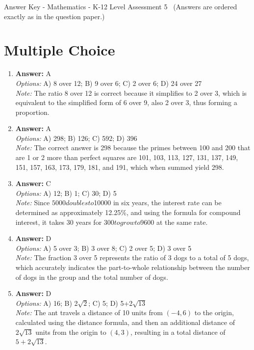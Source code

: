 \documentclass[12pt]{article}
\begin{document}
\begin{center}
Answer Key - Mathematics - K-12 Level Assessment 5 \
\small (Answers are ordered exactly as in the question paper.)
\end{center}

\section*{Multiple Choice}
\begin{enumerate}[label=\arabic*.]
\item \textbf{Answer:} A
\\ \textit{Options:} A) 8 over 12; B) 9 over 6; C) 2 over 6; D) 24 over 27
\\ \textit{Note:} The ratio 8 over 12 is correct because it simplifies to 2 over 3, which is equivalent to the simplified form of 6 over 9, also 2 over 3, thus forming a proportion.
\item \textbf{Answer:} A
\\ \textit{Options:} A) 298; B) 126; C) 592; D) 396
\\ \textit{Note:} The correct answer is 298 because the primes between 100 and 200 that are 1 or 2 more than perfect squares are 101, 103, 113, 127, 131, 137, 149, 151, 157, 163, 173, 179, 181, and 191, which when summed yield 298.
\item \textbf{Answer:} C
\\ \textit{Options:} A) 12; B) 1; C) 30; D) 5
\\ \textit{Note:} Since $5000 doubles to $10000 in six years, the interest rate can be determined as approximately 12.25\%, and using the formula for compound interest, it takes 30 years for $300 to grow to $9600 at the same rate.
\item \textbf{Answer:} D
\\ \textit{Options:} A) 5 over 3; B) 3 over 8; C) 2 over 5; D) 3 over 5
\\ \textit{Note:} The fraction 3 over 5 represents the ratio of 3 dogs to a total of 5 dogs, which accurately indicates the part-to-whole relationship between the number of dogs in the group and the total number of dogs.
\item \textbf{Answer:} D
\\ \textit{Options:} A) 16; B) 2\ensuremath{\sqrt{2}}; C) 5; D) 5+2\ensuremath{\sqrt{13}}
\\ \textit{Note:} The ant travels a distance of 10 units from $(-4,6)$ to the origin, calculated using the distance formula, and then an additional distance of $2\sqrt{13}$ units from the origin to $(4,3)$, resulting in a total distance of $5 + 2\sqrt{13}$.
\end{enumerate}
\end{document}
